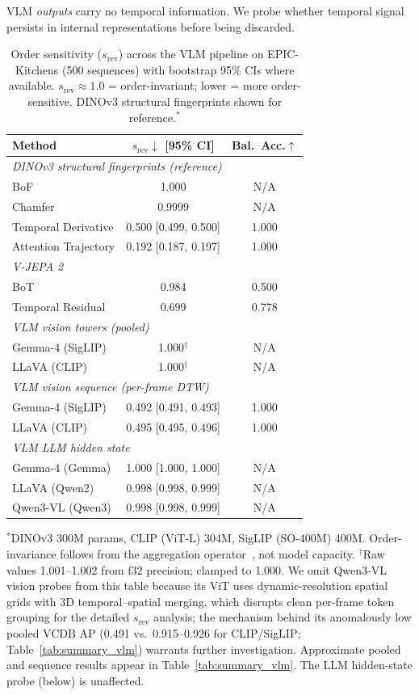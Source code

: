 \documentclass{article}
\theoremstyle{remark}
\begin{document}
VLM \emph{outputs} carry no temporal information. We probe whether temporal signal persists in internal representations before being discarded.

\begin{table}[ht]
\centering
\caption{Order sensitivity ($s_\text{rev}$) across the VLM pipeline on EPIC-Kitchens (500 sequences) with bootstrap 95\% CIs where available. $s_\text{rev} \approx 1.0$ = order-invariant; lower = more order-sensitive. DINOv3 structural fingerprints shown for reference.$^*$}
\label{tab:vlm_embedding}
\begin{tabular}{lcc}
\toprule
\textbf{Method} & $s_\text{rev}$$\downarrow$ \textbf{[95\% CI]} & \textbf{Bal.\ Acc.$\uparrow$} \\
\midrule
\multicolumn{3}{l}{\emph{DINOv3 structural fingerprints (reference)}} \\
\quad BoF & 1.000 & N/A \\
\quad Chamfer & 0.9999 & N/A \\
\quad Temporal Derivative & 0.500 [0.499, 0.500] & 1.000 \\
\quad Attention Trajectory & 0.192 [0.187, 0.197] & 1.000 \\
\midrule
\multicolumn{3}{l}{\emph{V-JEPA 2}} \\
\quad BoT & 0.984 & 0.500 \\
\quad Temporal Residual & 0.699 & 0.778 \\
\midrule
\multicolumn{3}{l}{\emph{VLM vision towers (pooled)}} \\
\quad Gemma-4 (SigLIP) & 1.000$^\dagger$ & N/A \\
\quad LLaVA (CLIP) & 1.000$^\dagger$ & N/A \\
\midrule
\multicolumn{3}{l}{\emph{VLM vision sequence (per-frame DTW)}} \\
\quad Gemma-4 (SigLIP) & 0.492 [0.491, 0.493] & 1.000 \\
\quad LLaVA (CLIP) & 0.495 [0.495, 0.496] & 1.000 \\
\midrule
\multicolumn{3}{l}{\emph{VLM LLM hidden state}} \\
\quad Gemma-4 (Gemma) & 1.000 [1.000, 1.000] & N/A \\
\quad LLaVA (Qwen2) & 0.998 [0.998, 0.999] & N/A \\
\quad Qwen3-VL (Qwen3) & 0.998 [0.998, 0.999] & N/A \\
\bottomrule
\end{tabular}
\begin{flushleft}
\small $^*$DINOv3 300M params, CLIP (ViT-L) 304M, SigLIP (SO-400M) 400M. Order-invariance follows from the aggregation operator~\cite{deepsets}, not model capacity. $^\dagger$Raw values 1.001--1.002 from f32 precision; clamped to 1.000. We omit Qwen3-VL vision probes from this table because its ViT uses dynamic-resolution spatial grids with 3D temporal--spatial merging, which disrupts clean per-frame token grouping for the detailed $s_\text{rev}$ analysis; the mechanism behind its anomalously low pooled VCDB AP (0.491 vs.\ 0.915--0.926 for CLIP/SigLIP; Table~\ref{tab:summary_vlm}) warrants further investigation. Approximate pooled and sequence results appear in Table~\ref{tab:summary_vlm}. The LLM hidden-state probe (below) is unaffected.

\end{flushleft}
\end{table}
\end{document}

